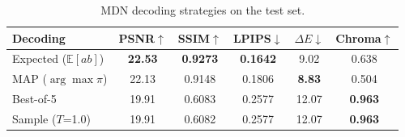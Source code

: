 \begin{table}[t]
\centering
\caption{MDN decoding strategies on the test set.}
\label{tab:mdn}
\small
\begin{tabular}{lccccc}
\toprule
Decoding & PSNR$\uparrow$ & SSIM$\uparrow$ & LPIPS$\downarrow$ & $\Delta E$$\downarrow$ & Chroma$\uparrow$ \\
\midrule
Expected ($\mathbb{E}[ab]$) & \textbf{22.53} & \textbf{0.9273} & \textbf{0.1642} & 9.02 & 0.638 \\
MAP ($\arg\max \pi$) & 22.13 & 0.9148 & 0.1806 & \textbf{8.83} & 0.504 \\
Best-of-5 & 19.91 & 0.6083 & 0.2577 & 12.07 & \textbf{0.963} \\
Sample ($T$=1.0) & 19.91 & 0.6082 & 0.2577 & 12.07 & \textbf{0.963} \\
\bottomrule
\end{tabular}
\end{table}